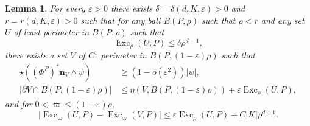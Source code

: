 \documentclass[reqno,11pt]{amsart}
\DeclareMathOperator{\Exc}{Exc}
\newcommand{\normal}{\mathbf n}
\newtheorem{lemma}[theorem]{Lemma}
\theoremstyle{definition}
\numberwithin{equation}{section}
\begin{document}
\begin{lemma}\label{single mollify}
For every $\varepsilon > 0$ there exists $\delta = \delta(d, K, \varepsilon) > 0$ and $r = r(d, K, \varepsilon) > 0$ such that for any ball $B(P, \rho)$ such that $\rho < r$ and any set $U$ of least perimeter in $B(P, \rho)$ such that
$$\Exc_\rho (U, P) \leq \delta \rho^{d - 1},$$
there exists a set $V$ of $C^1$ perimeter in $B(P, (1 - \varepsilon)\rho)$ such that
\begin{align}
\star((\Phi^P)^* \normal_V \wedge \psi) &\geq (1 - o(\varepsilon^2))|\psi|, \label{single mollify normal}\\
|\partial V \cap B(P, (1 - \varepsilon)\rho)| &\leq \eta(V, B(P, (1 - \varepsilon)\rho)) + \varepsilon \Exc_\rho (U, P), \label{single mollify minimality}
\end{align}
and for $0 < \varpi \leq (1 - \varepsilon)\rho$,
\begin{equation}
|\Exc_\varpi (U, P) - \Exc_\varpi (V, P)| \leq \varepsilon \Exc_\rho (U, P) + C|K| \rho^{d + 1}. \label{single mollify excess}
\end{equation}
\end{lemma}
\end{document}
